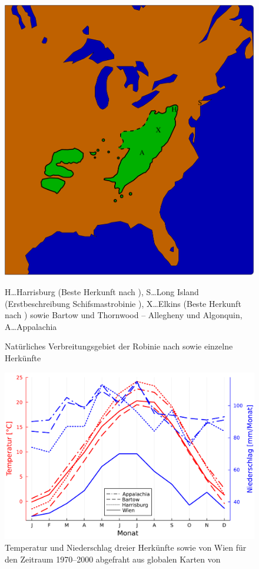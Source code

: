 \documentclass[twocolumn]{scrartcl}
\begin{document}
\begin{figure}[htbp]
  \centering
  \includegraphics[width=.9\linewidth]{./bild/map4}
  \caption{Natürliches Verbreitungsgebiet der Robinie nach \citet{little1971treeAtlas} sowie einzelne Herkünfte}
  \footnotesize{H\dots Harrisburg (Beste Herkunft nach \citet{cobbett1825woodlands}),
    S\dots Long Island (Erstbeschreibung Schifsmastrobinie \citet{raber1936shipmast}),
    X\dots Elkins (Beste Herkunft nach \citet{hopp1941robinie}) sowie Bartow und Thornwood -- Allegheny und Algonquin,
    A\dots Appalachia}
  \label{fig:verbreitungNatuerlich}
\end{figure}

\begin{figure}[htbp]
  \centering
  \includegraphics[width=.9\linewidth]{./bild/wetter}
  \caption{Temperatur und Niederschlag dreier Herkünfte sowie von Wien für den
  Zeitraum 1970--2000 abgefraht aus globalen Karten von \citet{worldclim2017}}
  \label{fig:wetter}
\end{figure}
\end{document}
